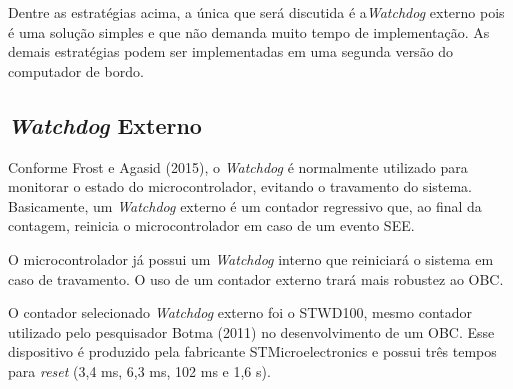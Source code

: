 Dentre as estratégias acima, a única que será discutida é a\textit{Watchdog} externo pois é uma solução simples e que não demanda muito tempo de implementação. As demais estratégias podem ser implementadas em uma segunda versão do computador de bordo.

\subsection{\textit{Watchdog} Externo}

Conforme  Frost e Agasid (2015), o \textit{Watchdog}  é normalmente utilizado para monitorar o estado do microcontrolador, evitando o travamento do sistema. Basicamente, um \textit{Watchdog} externo é um contador regressivo que, ao final da contagem, reinicia o microcontrolador em caso de um evento SEE. 

O microcontrolador já possui um \textit{Watchdog} interno que reiniciará o sistema em caso de travamento. O uso de um contador externo trará mais robustez ao OBC.

O contador selecionado \textit{Watchdog} externo foi o STWD100, mesmo contador utilizado pelo pesquisador Botma (2011) no desenvolvimento de um OBC. Esse dispositivo é produzido pela fabricante STMicroelectronics e possui três tempos para \textit{reset} (3,4 ms, 6,3 ms, 102 ms e 1,6 s).  

